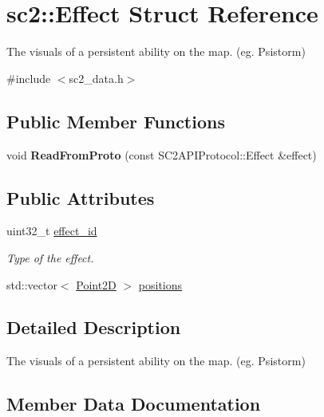 \hypertarget{structsc2_1_1_effect}{}\section{sc2\+:\+:Effect Struct Reference}
\label{structsc2_1_1_effect}


The visuals of a persistent ability on the map. (eg. Psistorm)  




{\ttfamily \#include $<$sc2\+\_\+data.\+h$>$}

\subsection*{Public Member Functions}
\begin{DoxyCompactItemize}
\item 
\mbox{\label{structsc2_1_1_effect_a581e59911e88973b8925d55c5850b8c5}} 
void {\bfseries Read\+From\+Proto} (const S\+C2\+A\+P\+I\+Protocol\+::\+Effect \&effect)
\end{DoxyCompactItemize}
\subsection*{Public Attributes}
\begin{DoxyCompactItemize}
\item 
\mbox{\label{structsc2_1_1_effect_a9662d93abf7bffd42ae9913df609ded4}} 
uint32\+\_\+t \hyperlink{structsc2_1_1_effect_a9662d93abf7bffd42ae9913df609ded4}{effect\+\_\+id}
\begin{DoxyCompactList}\small\item\em Type of the effect. \end{DoxyCompactList}\item 
std\+::vector$<$ \hyperlink{structsc2_1_1_point2_d}{Point2D} $>$ \hyperlink{structsc2_1_1_effect_ad7fdd1cf25fcc10aa577c9cfdaf74525}{positions}
\end{DoxyCompactItemize}


\subsection{Detailed Description}
The visuals of a persistent ability on the map. (eg. Psistorm) 

\subsection{Member Data Documentation}
\mbox{\label{structsc2_1_1_effect_ad7fdd1cf25fcc10aa577c9cfdaf74525}} 

